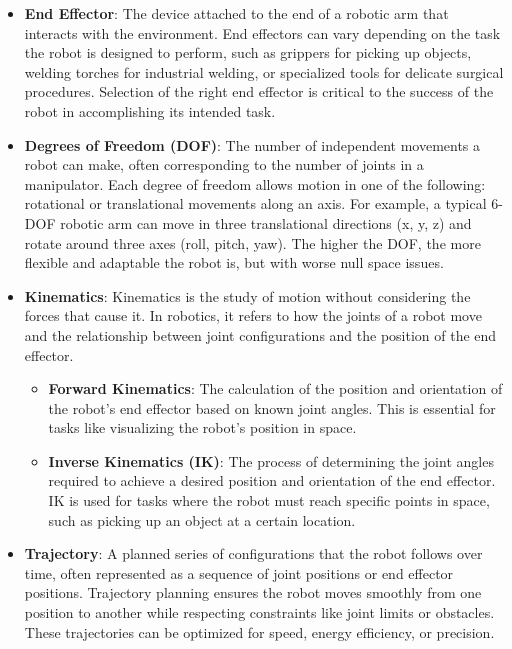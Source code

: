 \documentclass{article}
\begin{document}
\begin{itemize}
    \item \textbf{End Effector}: 
    The device attached to the end of a robotic arm that interacts with the environment. End effectors can vary depending on the task the robot is designed to perform, such as grippers for picking up objects, welding torches for industrial welding, or specialized tools for delicate surgical procedures. Selection of the right end effector is critical to the success of the robot in accomplishing its intended task.

    \item \textbf{Degrees of Freedom (DOF)}: 
    The number of independent movements a robot can make, often corresponding to the number of joints in a manipulator. Each degree of freedom allows motion in one of the following: rotational or translational movements along an axis. For example, a typical 6-DOF robotic arm can move in three translational directions (x, y, z) and rotate around three axes (roll, pitch, yaw). The higher the DOF, the more flexible and adaptable the robot is, but with worse null space issues.

    \item \textbf{Kinematics}: 
    Kinematics is the study of motion without considering the forces that cause it. In robotics, it refers to how the joints of a robot move and the relationship between joint configurations and the position of the end effector. 
    \begin{itemize}
        \item \textbf{Forward Kinematics}: 
        The calculation of the position and orientation of the robot's end effector based on known joint angles. This is essential for tasks like visualizing the robot’s position in space.
        \item \textbf{Inverse Kinematics (IK)}: 
        The process of determining the joint angles required to achieve a desired position and orientation of the end effector. IK is used for tasks where the robot must reach specific points in space, such as picking up an object at a certain location.
    \end{itemize}
    
    \item \textbf{Trajectory}: 
    A planned series of configurations that the robot follows over time, often represented as a sequence of joint positions or end effector positions. Trajectory planning ensures the robot moves smoothly from one position to another while respecting constraints like joint limits or obstacles. These trajectories can be optimized for speed, energy efficiency, or precision.


\end{itemize}
\end{document}

